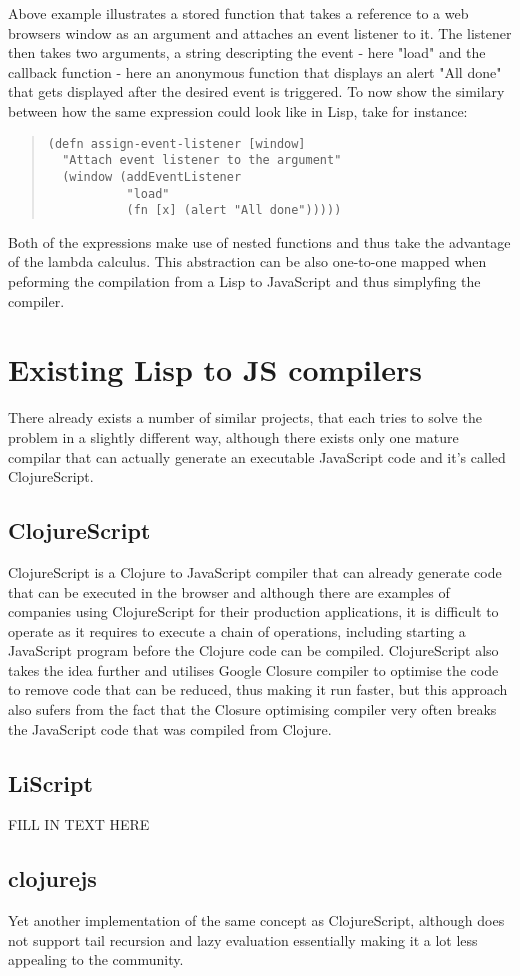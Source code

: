 Above example illustrates a stored function that takes a reference to a web browsers window as an argument and attaches an event listener to it. The listener then takes two arguments, a string descripting the event - here "load" and the callback function - here an anonymous function that displays an alert "All done" that gets displayed after the desired event is triggered.
To now show the similary between how the same expression could look like in Lisp, take for instance:

\begin{quote}
\begin{verbatim}
(defn assign-event-listener [window]
  "Attach event listener to the argument"
  (window (addEventListener 
           "load" 
           (fn [x] (alert "All done")))))
\end{verbatim}
\end{quote}

Both of the expressions make use of nested functions and thus take the advantage of the lambda calculus. This abstraction can be also one-to-one mapped when peforming the compilation from a Lisp to JavaScript and thus simplyfing the compiler.

\section{Existing Lisp to JS compilers}
There already exists a number of similar projects, that each tries to solve the problem in a slightly different way, although there exists only one mature compilar that can actually generate an executable JavaScript code and it's called ClojureScript.

\subsection{ClojureScript}
ClojureScript is a Clojure to JavaScript compiler that can already generate code that can be executed in the browser and although there are examples of companies using ClojureScript for their production applications, it is difficult to operate as it requires to execute a chain of operations, including starting a JavaScript program before the Clojure code can be compiled.
ClojureScript also takes the idea further and utilises Google Closure compiler to optimise the code to remove code that can be reduced, thus making it run faster, but this approach also sufers from the fact that the Closure optimising compiler very often breaks the JavaScript code that was compiled from Clojure.

\subsection{LiScript}
FILL IN TEXT HERE

\subsection{clojurejs}
Yet another implementation of the same concept as ClojureScript, although does not support tail recursion and lazy evaluation essentially making it a lot less appealing to the community.

